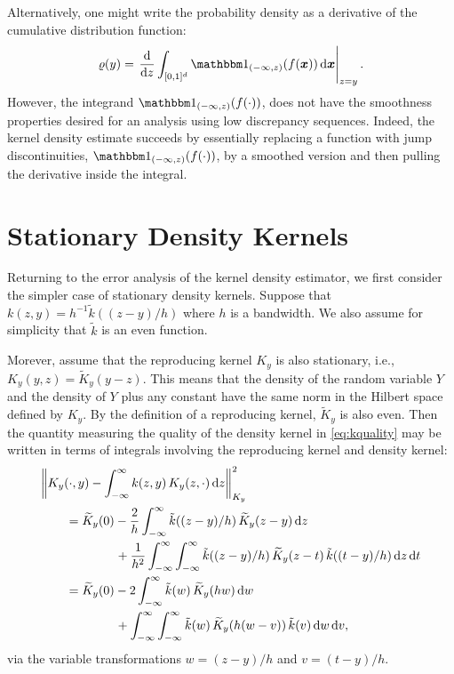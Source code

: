 \documentclass[letterpaper]{amsart}
\newcommand{\KY}{K_y}
\newcommand{\tKY}{\widetilde{K}_y}
\newcommand{\tk}{\tilde{k}}
\begin{document}
Alternatively, one might write the probability density as a derivative of the cumulative distribution function:
\begin{equation*}
	\varrho(y) = \left . \frac{\dif}{\dif z} \int_{[0,1]^d} \bbone_{(-\infty,z)}(f(\vx))\,  \dif \vx \right \rvert_{z = y}.
\end{equation*}
However, the integrand $\bbone_{(-\infty,z)}(f(\cdot))$, does not have the smoothness properties desired for an analysis using low discrepancy sequences. Indeed, the kernel density estimate succeeds by essentially replacing a function with jump discontinuities, $\bbone_{(-\infty,z)}(f(\cdot))$, by a smoothed version and then pulling the derivative inside the integral.


\section{Stationary Density Kernels}

Returning to the error analysis of the kernel density estimator, we first consider the simpler case of stationary density kernels.  Suppose that $k(z,y) = h^{-1}\tk((z-y)/h)$ where $h$ is a bandwidth. We also assume for simplicity that $\tk$ is an even function.

Morever, assume that the reproducing kernel $\KY$ is also stationary, i.e., $\KY(y,z) = \tKY(y-z)$. This means that the density of the random variable $Y$ and the density of $Y$ plus any constant have the same norm in the Hilbert space defined by $\KY$.  By the definition of a reproducing kernel, $\tKY$ is also even. Then the quantity measuring the quality of the density kernel in \eqref{eq:kquality} may be written in terms of integrals involving the reproducing kernel and density kernel:
\begin{align*}
	\MoveEqLeft{\norm[\KY]{\KY(\cdot,y) - \int_{-\infty}^{\infty} k(z,y) \, \KY(z,\cdot) \, \dif z}^2} \\
	&=  \tKY(0) -  \frac 2h \int_{-\infty}^{\infty} \tk((z-y)/h) \, \tKY(z-y) \, \dif z \\
	& \qquad \qquad + \frac 1{h^2} \int_{-\infty}^{\infty} \int_{-\infty}^{\infty}  \tk((z-y)/h)  \, \tKY(z-t) \, \tk((t-y)/h) \, \dif z \, \dif t \\
	&=   \tKY(0) - 2 \int_{-\infty}^{\infty} \tk(w) \, \tKY(hw) \, \dif w \\
	& \qquad \qquad + \int_{-\infty}^{\infty} \int_{-\infty}^{\infty}  \tk(w) \, \tKY(h(w-v)) \, \tk(v)\, \dif w \, \dif v,
\end{align*}
via the variable transformations $w = (z-y)/h$ and $v = (t-y)/h$.
\end{document}
